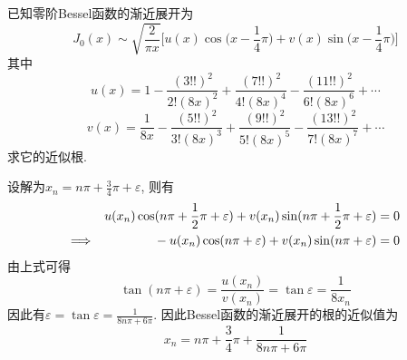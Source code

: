 \begin{problem}[习题1.10]
已知零阶Bessel函数的渐近展开为
\[
J_0(x) \sim \sqrt{\frac{2}{\pi x}}
\Big[
u(x)\cos\big(x-\frac{1}{4}\pi\big) + v(x)\sin\big(x-\frac{1}{4}\pi\big)
\Big]
\]
其中
\[
u(x) = 1 -\frac{(3!!)^2}{2!(8x)^2} + \frac{(7!!)^2}{4!(8x)^4} -\frac{(11!!)^2}{6!(8x)^6} + \cdots
\]
\[
v(x) = \frac{1}{8x} -\frac{(5!!)^2}{3!(8x)^3} + \frac{(9!!)^2}{5!(8x)^5} -\frac{(13!!)^2}{7!(8x)^7} + \cdots
\]
求它的近似根.
\end{problem}

\begin{solution}
设解为$x_{n}=n\pi+\frac{3}{4}\pi+\varepsilon$, 则有
\begin{align*}
u(x_{n})\cos(n\pi+\frac{1}{2}\pi+\varepsilon)+v(x_{n})\sin(n\pi+\frac{1}{2}\pi+\varepsilon) & =0\\
\Longrightarrow\hphantom{+\frac{1}{2}\pi+\frac{1}{2}\pi}-u(x_{n})\cos(n\pi+\varepsilon)+v(x_{n})\sin(n\pi+\varepsilon) & =0
\end{align*}
由上式可得
\[
\tan(n\pi+\varepsilon)=\frac{u(x_{n})}{v(x_{n})}=\tan\varepsilon=\frac{1}{8x_{n}}
\]
因此有$\varepsilon=\tan\varepsilon=\frac{1}{8n\pi+6\pi}$. 因此Bessel函数的渐近展开的根的近似值为
\[
x_{n}=n\pi+\frac{3}{4}\pi+\frac{1}{8n\pi+6\pi}
\]
\end{solution}
